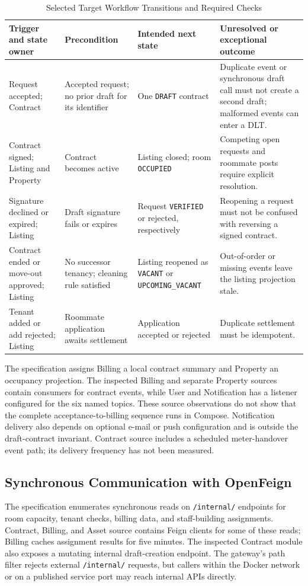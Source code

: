 \begin{table}[t]
\caption{Selected Target Workflow Transitions and Required Checks}
\label{tab:workflow_states}
\centering\footnotesize
\begin{tabularx}{\textwidth}{@{}p{}p{}p{}X@{}}
\toprule
Trigger and state owner & Precondition & Intended next state & Unresolved or exceptional outcome \\
\midrule
Request accepted; Contract & Accepted request; no prior draft for its identifier & One \texttt{DRAFT} contract & Duplicate event or synchronous draft call must not create a second draft; malformed events can enter a DLT. \\
Contract signed; Listing and Property & Contract becomes active & Listing closed; room \texttt{OCCUPIED} & Competing open requests and roommate posts require explicit resolution. \\
Signature declined or expired; Listing & Draft signature fails or expires & Request \texttt{VERIFIED} or rejected, respectively & Reopening a request must not be confused with reversing a signed contract. \\
Contract ended or move-out approved; Listing & No successor tenancy; cleaning rule satisfied & Listing reopened as \texttt{VACANT} or \texttt{UPCOMING\_VACANT} & Out-of-order or missing events leave the listing projection stale. \\
Tenant added or add rejected; Listing & Roommate application awaits settlement & Application accepted or rejected & Duplicate settlement must be idempotent. \\
\bottomrule
\end{tabularx}
\end{table}

The specification assigns Billing a local contract summary and Property an occupancy projection. The inspected Billing and separate Property sources contain consumers for contract events, while User and Notification has a listener configured for the six named topics. These source observations do not show that the complete acceptance-to-billing sequence runs in Compose. Notification delivery also depends on optional e-mail or push configuration and is outside the draft-contract invariant. Contract source includes a scheduled meter-handover event path; its delivery frequency has not been measured.

\subsection{Synchronous Communication with OpenFeign}
The specification enumerates synchronous reads on \texttt{/internal/} endpoints for room capacity, tenant checks, billing data, and staff-building assignments. Contract, Billing, and Asset source contains Feign clients for some of these reads; Billing caches assignment results for five minutes. The inspected Contract module also exposes a mutating internal draft-creation endpoint. The gateway's path filter rejects external \texttt{/internal/} requests, but callers within the Docker network or on a published service port may reach internal APIs directly.

